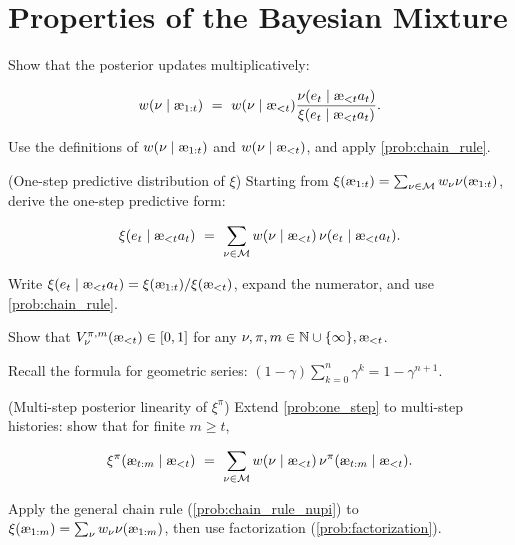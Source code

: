 \documentclass[fontsize=11pt, parskip=half]{scrartcl}
\newcommand{\cM}{\mathcal{M}}
\newcommand{\aes}{\textnormal{\ae}}
\begin{document}
\section{Properties of the Bayesian Mixture}\label{prob:mixture_props}



\begin{exercise}
\label{prob:posterior_update}
\skippable
Show that the posterior updates multiplicatively:

\[
    w(\nu \mid \aes_{1:t}) ~=~ w(\nu \mid \aes_{<t}) \frac{\nu(e_t \mid \aes_{<t} a_t)}{\xi(e_t \mid \aes_{<t} a_t)}.
\]
\begin{hint}
Use the definitions of $w(\nu \mid \aes_{1:t})$ and $w(\nu \mid \aes_{<t})$, and apply \cref{prob:chain_rule}.
\end{hint}
\end{exercise}


\begin{exercise}
\label{prob:one_step}
(One-step predictive distribution of $\xi$)
Starting from $\xi(\aes_{1:t}) = \sum_{\nu \in \cM} w_\nu \nu(\aes_{1:t})$, derive the one-step predictive form:

\[
    \xi(e_t \mid \aes_{<t} a_t) ~=~ \sum_{\nu \in \cM} w(\nu \mid \aes_{<t})\, \nu(e_t \mid \aes_{<t} a_t).
\]
\begin{hint}
Write $\xi(e_t \mid \aes_{<t} a_t) = \xi(\aes_{1:t}) / \xi(\aes_{<t})$, expand the numerator, and use \cref{prob:chain_rule}.
\end{hint}
\end{exercise}


\begin{exercise}
\label{prob:bounded_value}
Show that $V_\nu^{\pi,m}(\aes_{<t}) \in [0,1]$ for any $\nu, \pi, m \in \mathbb{N} \cup \{\infty\}, \aes_{<t}$.


\begin{hint}
Recall the formula for geometric series: $(1-\gamma)\sum_{k=0}^{n} \gamma^k = 1 - \gamma^{n+1}$.
\end{hint}
\end{exercise}


\begin{exercise}
\label{prob:multi_step_xi}
\skippable
(Multi-step posterior linearity of $\xi^\pi$)
Extend \cref{prob:one_step} to multi-step histories: show that for finite $m \geq t$,

\[
    \xi^\pi(\aes_{t:m} \mid \aes_{<t})
    ~=~ \sum_{\nu \in \cM} w(\nu \mid \aes_{<t})\, \nu^\pi(\aes_{t:m} \mid \aes_{<t}).
\]
\begin{hint}
Apply the general chain rule (\cref{prob:chain_rule_nupi}) to $\xi(\aes_{1:m}) = \sum_\nu w_\nu \nu(\aes_{1:m})$, then use factorization (\cref{prob:factorization}).
\end{hint}
\end{exercise}
\end{document}
